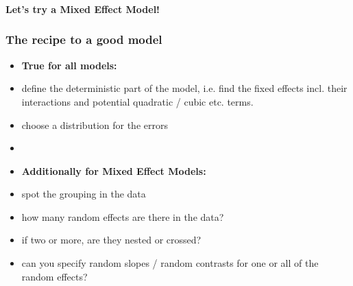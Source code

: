 \documentclass{beamer}
\begin{document}
\begin{frame}[fragile]
    \frametitle{}
    \huge\color{purple}\textbf{Let's try a Mixed Effect Model!}
\end{frame}

\begin{frame}
    \frametitle{The recipe to a good model}
    \begin{itemize}
        \item[] \textbf{True for all models:}
        \item define the deterministic part of the model, i.e. find the fixed effects incl. their interactions and potential quadratic / cubic etc. terms.
        \item choose a distribution for the errors
        \item[] 
        \item[] \textbf{Additionally for Mixed Effect Models:}
        \item spot the grouping in the data
        \item how many random effects are there in the data?
        \item if two or more, are they nested or crossed?
        \item can you specify random slopes / random contrasts for one or all of the random effects?
    \end{itemize}
\end{frame}
\end{document}

